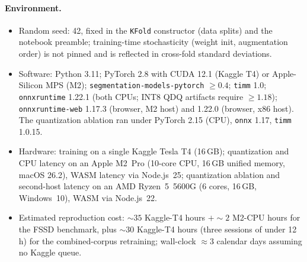 \paragraph{Environment.}
\begin{itemize}\setlength\itemsep{2pt}
\item Random seed: 42, fixed in the \texttt{KFold} constructor (data splits) and the notebook preamble; training-time stochasticity (weight init, augmentation order) is not pinned and is reflected in cross-fold standard deviations.
\item Software: Python 3.11; PyTorch 2.8 with CUDA 12.1 (Kaggle T4) or Apple-Silicon MPS (M2); \texttt{segmentation-models-pytorch} $\geq 0.4$; \texttt{timm} 1.0; \texttt{onnxruntime} 1.22.1 (both CPUs; INT8 QDQ artifacts require $\geq 1.18$); \texttt{onnxruntime-web} 1.17.3 (browser, M2 host) and 1.22.0 (browser, x86 host). The quantization ablation ran under PyTorch 2.15 (CPU), \texttt{onnx} 1.17, \texttt{timm} 1.0.15.
\item Hardware: training on a single Kaggle Tesla T4 (16\,GB); quantization and CPU latency on an Apple M2~Pro (10-core CPU, 16\,GB unified memory, macOS 26.2), WASM latency via Node.js~25; quantization ablation and second-host latency on an AMD Ryzen~5~5600G (6 cores, 16\,GB, Windows~10), WASM via Node.js~22.
\item Estimated reproduction cost: $\sim 35$ Kaggle-T4 hours $+ \sim 2$ M2-CPU hours for the FSSD benchmark, plus $\sim 30$ Kaggle-T4 hours (three sessions of under 12\,h) for the combined-corpus retraining; wall-clock $\approx 3$ calendar days assuming no Kaggle queue.
\end{itemize}
